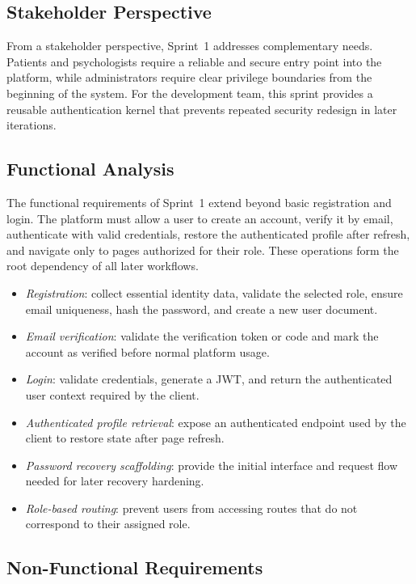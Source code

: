 \documentclass[a4paper,12pt]{report}
\begin{document}
\subsection{Stakeholder Perspective}

From a stakeholder perspective, Sprint~1 addresses complementary needs. Patients and psychologists require a reliable and secure entry point into the platform, while administrators require clear privilege boundaries from the beginning of the system. For the development team, this sprint provides a reusable authentication kernel that prevents repeated security redesign in later iterations.

\subsection{Functional Analysis}

The functional requirements of Sprint~1 extend beyond basic registration and login. The platform must allow a user to create an account, verify it by email, authenticate with valid credentials, restore the authenticated profile after refresh, and navigate only to pages authorized for their role. These operations form the root dependency of all later workflows.

\begin{itemize}[leftmargin=*]
  \item[--] \emph{Registration}: collect essential identity data, validate the selected role, ensure email uniqueness, hash the password, and create a new user document.
  \item[--] \emph{Email verification}: validate the verification token or code and mark the account as verified before normal platform usage.
  \item[--] \emph{Login}: validate credentials, generate a JWT, and return the authenticated user context required by the client.
  \item[--] \emph{Authenticated profile retrieval}: expose an authenticated endpoint used by the client to restore state after page refresh.
  \item[--] \emph{Password recovery scaffolding}: provide the initial interface and request flow needed for later recovery hardening.
  \item[--] \emph{Role-based routing}: prevent users from accessing routes that do not correspond to their assigned role.
\end{itemize}

\subsection{Non-Functional Requirements}
\end{document}
